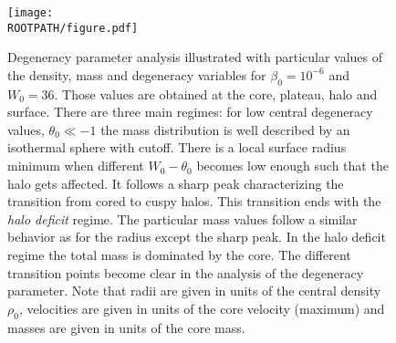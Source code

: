 \begin{figure}%
	\centering%
	\texttt{[image: \\ROOTPATH/figure.pdf]}
	\caption{Degeneracy parameter analysis illustrated with particular values of the density, mass and degeneracy variables for $\beta_0 = 10^{-6}$ and $W_0 = 36$. Those values are obtained at the core, plateau, halo and surface. There are three main regimes: for low central degeneracy values, $\theta_0 \ll -1$ the mass distribution is well described by an isothermal sphere with cutoff. There is a local surface radius minimum when different $W_0 - \theta_0$ becomes low enough such that the halo gets affected. It follows a sharp peak characterizing the transition from cored to cuspy halos. This transition ends with the \textit{halo deficit} regime. The particular mass values follow a similar behavior as for the radius except the sharp peak. In the halo deficit regime the total mass is dominated by the core. The different transition points become clear in the analysis of the degeneracy parameter. Note that radii are given in units of the central density $\rho_0$, velocities are given in units of the core velocity (maximum) and masses are given in units of the core mass.}%
	\label{fig:analysis:with-cutoff:theta0:core}%
\end{figure}